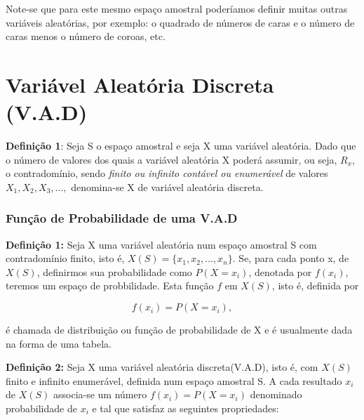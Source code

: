 
Note-se que para este mesmo espaço amostral poderíamos definir
muitas outras variáveis aleatórias, por exemplo: o quadrado de
números de caras e o número de caras menos o número de coroas,
etc.


\section{Variável Aleatória Discreta (V.A.D)}

\textbf{Definição 1}: Seja S o espaço amostral e seja X uma
variável aleatória. Dado que o número de valores dos quais a
variável aleatória X poderá assumir, ou seja, $R_{x}$, o
contradomínio, sendo\emph{ finito ou infinito contável ou
enumerável} de valores $X_{1}, X_{2}, X_{3}, \ldots,$ denomina-se
X de variável aleatória discreta.

\subsubsection{Função de Probabilidade de uma V.A.D}

\textbf{Definição 1:} Seja X uma variável aleatória num espaço
amostral S com contradomínio finito, isto é, $X(S)=\{x_{1}, x_{2},
\ldots, x_{n} \}$. Se, para cada ponto x, de $X(S)$, definirmos
sua probabilidade como $P(X=x_{i})$, denotada por $f(x_{i})$,
teremos um espaço de probbilidade. Esta função $f$ em $X(S)$, isto
é, definida por


\begin{equation}\label{}
f(x_{i})=P(X=x_{i}),
\end{equation}

é chamada de distribuição ou função de probabilidade de X e é
usualmente dada na forma de uma tabela.


\begin{table}[!htb]
\end{table}


\newpage
\textbf{Definição 2:} Seja X uma variável aleatória
discreta(V.A.D), isto é, com $X(S)$ finito e infinito enumerável,
definida num espaço amostral S. A cada resultado $x_{i}$ de $X(S)$
associa-se um número $f(x_{i})=P(X=x_{i})$ denominado
probabilidade de $x_{i}$ e tal que satisfaz as seguintes
propriedades:


